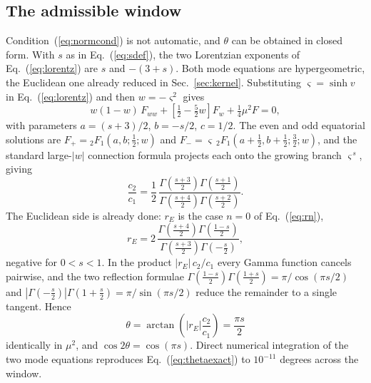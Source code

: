 \documentclass[aps,prd,twocolumn,superscriptaddress,nofootinbib,longbibliography]{revtex4-2}
\begin{document}
\subsection{The admissible window}
Condition~(\ref{eq:normcond}) is not automatic, and $\theta$ can be obtained
in closed form. With $s$ as in Eq.~(\ref{eq:sdef}), the two Lorentzian
exponents of Eq.~(\ref{eq:lorentz}) are $s$ and $-(3+s)$. Both mode equations
are hypergeometric, the Euclidean one already reduced in
Sec.~\ref{sec:kernel}. Substituting
$\varsigma=\sinh v$ in Eq.~(\ref{eq:lorentz}) and then $w=-\varsigma^2$ gives
\begin{equation}
w(1-w)\,F_{ww}+\left[\tfrac12-\tfrac52w\right]F_w+\tfrac14\mu^2F=0,
\label{eq:hyper}
\end{equation}
with parameters $a=(s+3)/2$, $b=-s/2$, $c=1/2$. The even and odd equatorial
solutions are $F_+={}_2F_1(a,b;\tfrac12;w)$ and
$F_-=\varsigma\,{}_2F_1(a+\tfrac12,b+\tfrac12;\tfrac32;w)$, and the standard
large-$|w|$ connection formula \cite{DLMF} projects each onto the growing
branch $\varsigma^{\,s}$, giving
\begin{equation}
\frac{c_2}{c_1}
=\frac12\,
\frac{\Gamma\!\left(\frac{s+3}{2}\right)\Gamma\!\left(\frac{s+1}{2}\right)}
     {\Gamma\!\left(\frac{s+4}{2}\right)\Gamma\!\left(\frac{s+2}{2}\right)} .
\label{eq:cratio}
\end{equation}
The Euclidean side is already done: $r_E$ is the case $n=0$ of
Eq.~(\ref{eq:rn}),
\begin{equation}
r_E=2\,
\frac{\Gamma\!\left(\frac{s+4}{2}\right)\Gamma\!\left(\frac{1-s}{2}\right)}
     {\Gamma\!\left(\frac{s+3}{2}\right)\Gamma\!\left(-\frac{s}{2}\right)} ,
\label{eq:rE}
\end{equation}
negative for $0<s<1$. In the product $|r_E|\,c_2/c_1$ every Gamma
function cancels pairwise, and the two reflection formulae
$\Gamma(\frac{1-s}{2})\Gamma(\frac{1+s}{2})=\pi/\cos(\pi s/2)$ and
$|\Gamma(-\frac{s}{2})|\Gamma(1+\frac{s}{2})=\pi/\sin(\pi s/2)$ reduce the
remainder to a single tangent. Hence
\begin{equation}
\boxed{\;\theta=\arctan\!\left(|r_E|\frac{c_2}{c_1}\right)=\frac{\pi s}{2}\;}
\label{eq:thetaexact}
\end{equation}
identically in $\mu^2$, and $\cos2\theta=\cos(\pi s)$. Direct numerical
integration of the two mode equations reproduces Eq.~(\ref{eq:thetaexact}) to
$10^{-11}$ degrees across the window.
\end{document}
